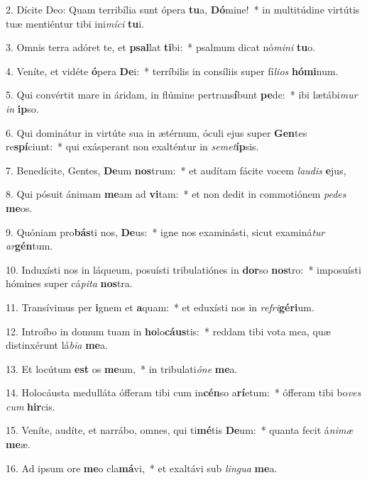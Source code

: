 2. Dícite Deo: Quam terribília sunt ópera \textbf{tu}a, \textbf{Dó}mine!~*  in multitúdine virtútis tuæ mentiéntur tibi ini\textit{mí}\textit{ci} \textbf{tu}i.\

3. Omnis terra adóret te, et \textbf{psal}lat \textbf{ti}bi:~*  psalmum dicat nó\textit{mi}\textit{ni} \textbf{tu}o.\

4. Veníte, et vidéte \textbf{ó}pera \textbf{De}i:~*  terríbilis in consíliis super fí\textit{li}\textit{os} \textbf{hó}\textbf{mi}num.\

5. Qui convértit mare in áridam, in flúmine pertrans\textbf{í}bunt \textbf{pe}de:~*  ibi lætábi\textit{mur} \textit{in} \textbf{ip}so.\

6. Qui dominátur in virtúte sua in ætérnum, óculi ejus super \textbf{Gen}tes re\textbf{spí}ciunt:~*  qui exásperant non exalténtur in \textit{se}\textit{met}\textbf{íp}sis.\

7. Benedícite, Gentes, \textbf{De}um \textbf{nos}trum:~*  et audítam fácite vocem \textit{lau}\textit{dis} \textbf{e}jus,\

8. Qui pósuit ánimam \textbf{me}am ad \textbf{vi}tam:~*  et non dedit in commotiónem \textit{pe}\textit{des} \textbf{me}os.\

9. Quóniam pro\textbf{bás}ti nos, \textbf{De}us:~*  igne nos examinásti, sicut examiná\textit{tur} \textit{ar}\textbf{gén}tum.\

10. Induxísti nos in láqueum, posuísti tribulatiónes in \textbf{dor}so \textbf{nos}tro:~*  imposuísti hómines super cá\textit{pi}\textit{ta} \textbf{nos}tra.\

11. Transívimus per \textbf{i}gnem et \textbf{a}quam:~*  et eduxísti nos in \textit{re}\textit{fri}\textbf{gé}\textbf{ri}um.\

12. Introíbo in domum tuam in \textbf{ho}lo\textbf{cáus}tis:~*  reddam tibi vota mea, quæ distinxérunt lá\textit{bi}\textit{a} \textbf{me}a.\

13. Et locútum \textbf{est} os \textbf{me}um,~*  in tribulati\textit{ó}\textit{ne} \textbf{me}a.\

14. Holocáusta medulláta ófferam tibi cum in\textbf{cén}so a\textbf{rí}etum:~*  ófferam tibi bo\textit{ves} \textit{cum} \textbf{hir}cis.\

15. Veníte, audíte, et narrábo, omnes, qui ti\textbf{mé}tis \textbf{De}um:~*  quanta fecit á\textit{ni}\textit{mæ} \textbf{me}æ.\

16. Ad ipsum ore \textbf{me}o cla\textbf{má}vi,~*  et exaltávi sub \textit{lin}\textit{gua} \textbf{me}a.\

